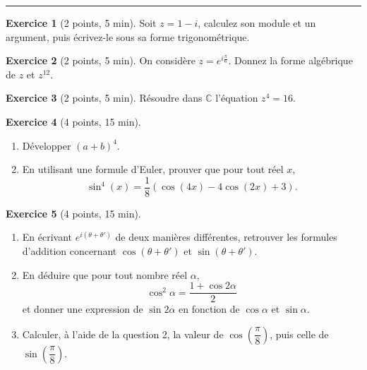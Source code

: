 \documentclass{exam}
\theoremstyle{definition}
\newtheorem{exercice}{Exercice}
\begin{document}
\Large


\medskip\hrule
\vspace{2em}

\begin{exercice}[2 points, 5 min]
Soit $z = 1 - i$, calculez son module et un argument, puis écrivez-le sous sa forme trigonométrique.
\end{exercice}

\begin{exercice}[2 points, 5 min]
On considère \( z = e^{i\frac{\pi}{6}} \). Donnez la forme algébrique de $z$ et $z^{12}$.
\end{exercice}

\begin{exercice}[2 points, 5 min]
Résoudre dans \( \mathbb{C} \) l'équation \( z^{4} = 16 \).
\end{exercice}

\begin{exercice}[4 points, 15 min]
\begin{enumerate}
    \item Développer \( (a + b)^4 \).
    \item En utilisant une formule d'Euler, prouver que pour tout réel \( x \),
       \[
       \sin^4(x) = \dfrac{1}{8} \left( \cos(4x) - 4\cos(2x) + 3 \right).
       \]
\end{enumerate}
\end{exercice}

\begin{exercice}[4 points, 15 min]
\begin{enumerate}
    \item En écrivant \( e^{i(\theta + \theta')} \) de deux manières différentes, retrouver les formules d'addition concernant \( \cos(\theta + \theta') \) et \( \sin(\theta + \theta') \).
    \item En déduire que pour tout nombre réel \( \alpha \),
       \[
       \cos^2 \alpha = \dfrac{1 + \cos 2\alpha}{2}
       \]
       et donner une expression de \( \sin 2\alpha \) en fonction de \( \cos \alpha \) et \( \sin \alpha \).
    \item Calculer, à l'aide de la question 2, la valeur de \( \cos\left( \dfrac{\pi}{8} \right) \), puis celle de \( \sin\left( \dfrac{\pi}{8} \right) \).
\end{enumerate}
\end{exercice}
\end{document}
